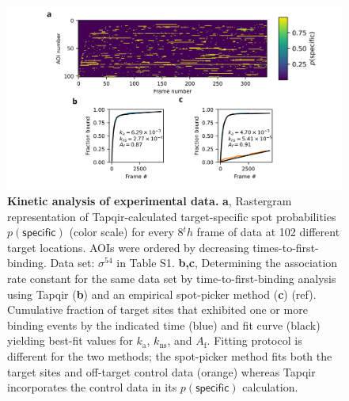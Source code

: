 \begin{figure}[t]
\centering
\includegraphics[width=183mm]{figures/figure7/figure7.png}
\caption{\textbf{Kinetic analysis of experimental data.}   \textbf{a}, Rastergram representation of Tapqir-calculated target-specific spot  probabilities $p(\mathsf{specific})$ (color scale) for every 8$^th$ frame of data at 102 different target locations.  AOIs were ordered by decreasing times-to-first-binding. Data set: $\sigma^{54}$ in Table S1. \textbf{b,c}, Determining the association rate constant for the same data set by  time-to-first-binding analysis using Tapqir (\textbf{b}) and an empirical spot-picker method (\textbf{c}) (ref).   Cumulative fraction of target sites that exhibited one or more binding events by the indicated time (blue) and fit curve (black) yielding best-fit values for $k_\mathrm{a}$, $k_\mathrm{ns}$, and $A_\mathrm{f}$. Fitting protocol is different for the two methods; the spot-picker method fits both the target sites and off-target control data (orange) whereas Tapqir incorporates the control data in its $p(\mathsf{specific})$ calculation.
}
\label{fig:experimental_data}
\end{figure}